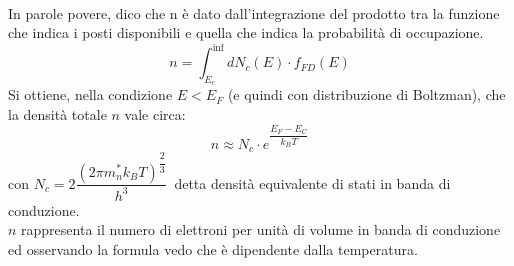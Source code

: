 \\
In parole povere, dico che n è dato dall'integrazione del prodotto tra la funzione che indica i posti disponibili e quella che indica la probabilità di occupazione.\\
%
\begin{equation}
    n=\int_{E_c}^{\inf}dN_c(E) \cdot f_{FD}(E)
\end{equation}
%
Si ottiene, nella condizione $E < E_F$ (e quindi con distribuzione di Boltzman), che la densità totale $n$ vale circa:
%
\begin{equation}
    n \approx N_c \cdot e^{\dfrac{E_F-E_C}{k_B T}}
\end{equation}
%
con $N_c=2\dfrac{{(2\pi m_n^* k_B T)}^{\dfrac{2}{3}}}{h^3} \,$ detta densità equivalente di stati in banda di conduzione.\\
$n$ rappresenta il numero di elettroni per unità di volume in banda di conduzione ed osservando la formula vedo che è dipendente dalla temperatura.\\

